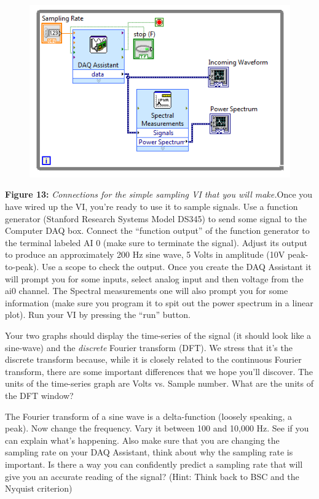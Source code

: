 \documentclass{../lab}
\begin{document}
\begin{figure}[h]
    \centering
    \href{http://experimentationlab.berkeley.edu/sites/default/files/NLD/FirstExcersizeBlockDiagram.png}{\includegraphics[width=0.5\linewidth]{images/FirstExcersizeBlockDiagram.png}}
    \caption{}
    \label{fig:FirstExcersizeBlockDiagram}
\end{figure}

\textbf{Figure 13:} \emph{Connections for the simple sampling VI that you will make.}Once you have wired up the VI, you're ready to use it to sample signals. Use a function generator (Stanford Research Systems Model DS345) to send some signal to the Computer DAQ box. Connect the ``function output'' of the function generator to the terminal labeled AI 0 (make sure to terminate the signal). Adjust its output to produce an approximately 200 Hz sine wave, 5 Volts in amplitude (10V peak-to-peak). Use a scope to check the output. Once you create the DAQ Assistant it will prompt you for some inputs, select analog input and then voltage from the ai0 channel. The Spectral measurements one will also prompt you for some information (make sure you program it to spit out the power spectrum in a linear plot).  Run your VI by pressing the ``run'' button.

Your two graphs should display the time-series of the signal (it should look like a sine-wave) and the \emph{discrete} Fourier transform (DFT). We stress that it's the discrete transform because, while it is closely related to the continuous Fourier transform, there are some important differences that we hope you'll discover. The units of the time-series graph are Volts vs. Sample number. What are the units of the DFT window?

The Fourier transform of a sine wave is a delta-function (loosely speaking, a peak). Now change the frequency. Vary it between 100 and 10,000 Hz. See if you can explain what's happening. Also make sure that you are changing the sampling rate on your DAQ Assistant, think about why the sampling rate is important. Is there a way you can confidently predict a sampling rate that will give you an accurate reading of the signal? (Hint: Think back to BSC and the Nyquist criterion)
\end{document}
